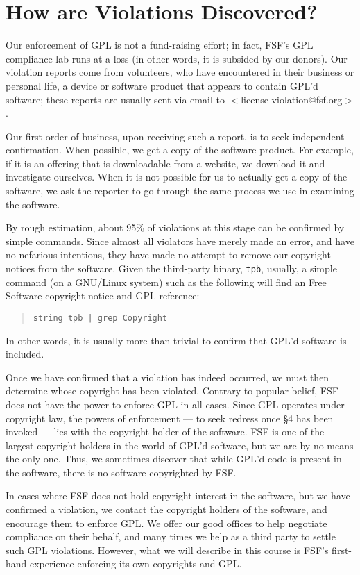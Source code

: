 \documentclass[12pt]{report}
\begin{document}
\section{How are Violations Discovered?}

Our enforcement of GPL is not a fund-raising effort; in fact, FSF's GPL
compliance lab runs at a loss (in other words, it is subsided by our
donors).  Our violation reports come from volunteers, who have encountered
in their business or personal life, a device or software product that
appears to contain GPL'd software; these reports are usually sent via
email to $<$license-violation@fsf.org$>$.

Our first order of business, upon receiving such a report, is to seek
independent confirmation.  When possible, we get a copy of the software
product.  For example, if it is an offering that is downloadable from a
website, we download it and investigate ourselves.  When it is not
possible for us to actually get a copy of the software, we ask the
reporter to go through the same process we use in examining the software.

By rough estimation, about 95\% of violations at this stage can be
confirmed by simple commands.  Since almost all violators have merely made
an error, and have no nefarious intentions, they have made no attempt to
remove our copyright notices from the software.  Given the third-party
binary, {\tt tpb}, usually, a simple command (on a GNU/Linux system) such
as the following will find an Free Software copyright notice and GPL
reference:
\begin{quotation}
{\tt string tpb | grep Copyright}
\end{quotation}
In other words, it is usually more than trivial to confirm that GPL'd
software is included.

Once we have confirmed that a violation has indeed occurred, we must then
determine whose copyright has been violated.  Contrary to popular belief,
FSF does not have the power to enforce GPL in all cases.  Since GPL
operates under copyright law, the powers of enforcement --- to seek
redress once \S 4 has been invoked --- lies with the copyright holder of
the software.  FSF is one of the largest copyright holders in the world
of GPL'd software, but we are by no means the only one.  Thus, we
sometimes discover that while GPL'd code is present in the software,
there is no software copyrighted by FSF.

In cases where FSF does not hold copyright interest in the software, but
we have confirmed a violation, we contact the copyright holders of the
software, and encourage them to enforce GPL\@.  We offer our good offices
to help negotiate compliance on their behalf, and many times we help as a
third party to settle such GPL violations.  However, what we will
describe in this course is FSF's first-hand experience enforcing its own
copyrights and GPL\@.
\end{document}
